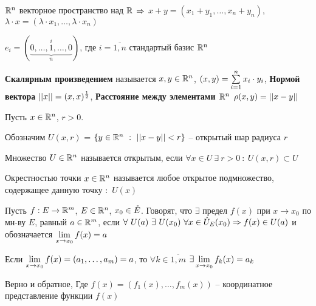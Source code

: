 \begin{defs}
	$\mathbb{R}^n$ векторное пространство над $\mathbb{R}$ $\Rightarrow$ $x + y = (x_1+y_1, \ldots, x_{n}+y_{n})$, $\lambda \cdot x = (\lambda \cdot x_1, \ldots, \lambda \cdot x_n)$
\end{defs}

\begin{defs}
	$e_i = (\underbrace{0, \ldots, 1,\ldots,0}_n^i)$, где $i = \overline{1,n}$ стандартый базис $\mathbb{R}^n$
\end{defs}

\begin{defs}
	\textbf{Скалярным произведением} называется $x,y \in \mathbb{R}^n$, $\left( x,y\right) = \sum\limits_{i=1}^{n}x_i \cdot y_i$, \textbf{Нормой вектора} $\left|\left| x\right|\right| = (x,x)^{\frac{1}{2}}$, \textbf{Расстояние между элементами $\mathbb{R}^n$} $\rho(x,y)= \left|\left| x-y\right|\right|$
\end{defs}

\begin{defs}
	Пусть $x \in \mathbb{R}^n$, $r > 0$.

	Обозначим $U(x,r)$ = $\left\{ y \in \mathbb{R}^n \ : \ \left|\left| x-y\right|\right| < r\right\}$ -- открытый шар радиуса $r$
\end{defs}

\begin{defs}
	Множество $U \in \mathbb{R}^n$ называется открытым, если $\forall x \in U \ \exists \ r > 0 \ : \  U(x,r) \subset U$
\end{defs}

\begin{defs}
	Окрестностью точки $x \in \mathbb{R}^n$ называется любое открытое подмножество, содержащее данную точку $:$ $U(x)$
\end{defs}

\begin{defs}
	Пусть $f: E \to \mathbb{R}^m$, $E \in \mathbb{R}^n$, $x_0 \in \mathring{E}$. Говорят, что $\exists$ предел $f(x)$ при $x\to x_0$ по мн-ву $E$, равный $a \in \mathbb{R}^m$, если $\forall \ U(a) \ \exists \ U(x_0) \ \forall x \in \mathring{U}_{E}(x_0) \Rightarrow f(x) \in U(a)$
	и обозначается $\lim\limits_{x \to x_0}f(x)= a$
\end{defs}

\begin{claim}[]
	Если $\lim\limits_{x\to x_0}f(x)=(a_1,\ldots,a_m)=a$, то $\forall k \in \overline{1,m} $ $\exists \lim\limits_{x \to x_0}f_k(x)=a_k$

	Верно и обратное, Где $f(x)=(f_1(x),\ldots,f_m(x))$ -- координатное представление функции $f(x)$

\end{claim}

